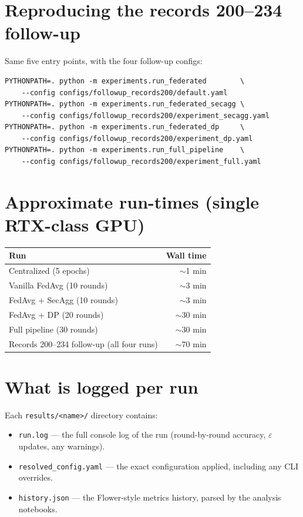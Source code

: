 \documentclass[11pt,a4paper]{report}
\begin{document}
\section{Reproducing the records 200--234 follow-up}

Same five entry points, with the four follow-up configs:

\begin{verbatim}
PYTHONPATH=. python -m experiments.run_federated        \
    --config configs/followup_records200/default.yaml
PYTHONPATH=. python -m experiments.run_federated_secagg \
    --config configs/followup_records200/experiment_secagg.yaml
PYTHONPATH=. python -m experiments.run_federated_dp     \
    --config configs/followup_records200/experiment_dp.yaml
PYTHONPATH=. python -m experiments.run_full_pipeline    \
    --config configs/followup_records200/experiment_full.yaml
\end{verbatim}

\section{Approximate run-times (single RTX-class GPU)}

\begin{tabular}{lr}
  \toprule
  Run & Wall time \\
  \midrule
  Centralized (5 epochs)                    & $\sim$1 min \\
  Vanilla FedAvg (10 rounds)                & $\sim$3 min \\
  FedAvg + SecAgg (10 rounds)               & $\sim$3 min \\
  FedAvg + DP (20 rounds)                   & $\sim$30 min \\
  Full pipeline (30 rounds)                 & $\sim$30 min \\
  \midrule
  Records 200--234 follow-up (all four runs) & $\sim$70 min \\
  \bottomrule
\end{tabular}

\section{What is logged per run}

Each \texttt{results/<name>/} directory contains:

\begin{itemize}[leftmargin=*]
  \item \texttt{run.log} --- the full console log of the run
  (round-by-round accuracy, $\varepsilon$ updates, any warnings).
  \item \texttt{resolved\_config.yaml} --- the exact configuration
  applied, including any CLI overrides.
  \item \texttt{history.json} --- the Flower-style metrics history,
  parsed by the analysis notebooks.
\end{itemize}
\end{document}
